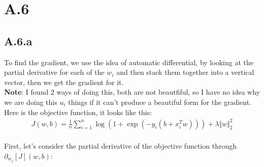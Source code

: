 \documentclass[]{article}
\begin{document}
\section*{A.6}
    \subsection*{A.6.a}
        To find the gradient, we use the idea of automatic differential, by looking at the partial derivative for each of the $w_i$ and then stack them together into a vertical vector, then we get the gradient for it.
        \\
        \textbf{Note}: I found 2 ways of doing this, both are not beautfiful, so I have no idea why we are doing this $u_i$ things if it can't produce a beautiful form for the gradient.  
        \\
        Here is the objective function, it looks like this: 
        \begin{align*}\tag{A.6.a.1}\label{eqn:A.6.a.1}
            J(w, b) = \frac{1}{n}\sum_{i = 1}^{n}
                \log(1 + \exp(-y_i(b + x^T_iw))) 
                +
                \lambda \Vert w\Vert_2^2
        \end{align*}
        \\
        First, let's consider the partial derivative of the objective function through $\partial_{w_j}[J](w, b)$: 
\end{document}
